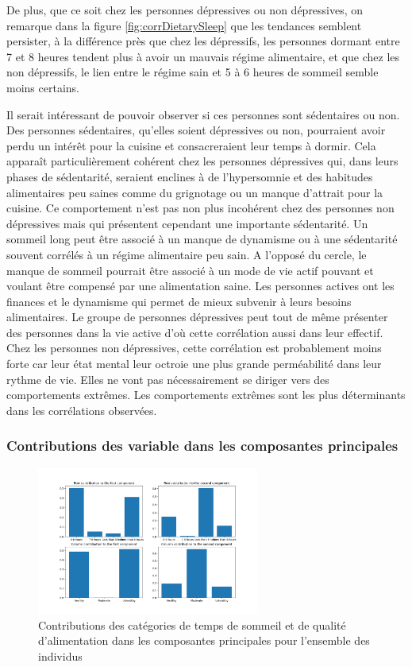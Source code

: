 De plus, que ce soit chez les personnes dépressives ou non dépressives, on remarque dans la figure \ref{fig:corrDietarySleep} que les tendances semblent persister, à la différence près que chez les dépressifs, les personnes dormant entre 7 et 8 heures tendent plus à avoir un mauvais régime alimentaire, et que chez les non dépressifs, le lien entre le régime sain et 5 à 6 heures de sommeil semble moins certains. 

Il serait intéressant de pouvoir observer si ces personnes sont sédentaires ou non. 
Des personnes sédentaires, qu’elles soient dépressives ou non, pourraient avoir perdu un intérêt pour la cuisine et consacreraient leur temps à dormir. Cela apparaît particulièrement cohérent chez les personnes dépressives qui, dans leurs phases de sédentarité, seraient enclines à de l’hypersomnie et des habitudes alimentaires peu saines comme du grignotage ou un manque d’attrait pour la cuisine. Ce comportement n’est pas non plus incohérent chez des personnes non dépressives mais qui présentent cependant une importante sédentarité. Un sommeil long peut être associé à un manque de dynamisme ou à une sédentarité souvent corrélés à un régime alimentaire peu sain.
A l’opposé du cercle, le manque de sommeil pourrait être associé à un mode de vie actif pouvant et voulant être compensé par une alimentation saine. Les personnes actives ont les finances et le dynamisme qui permet de mieux subvenir à leurs besoins alimentaires. Le groupe de personnes dépressives peut tout de même présenter des personnes dans la vie active d’où cette corrélation aussi dans leur effectif. Chez les personnes non dépressives, cette corrélation est probablement moins forte car leur état mental leur octroie une plus grande perméabilité dans leur rythme de vie. Elles ne vont pas nécessairement se diriger vers des comportements extrêmes.
Les comportements extrêmes sont les plus déterminants dans les corrélations observées.

\subsubsection{Contributions des variable dans les composantes principales}

\begin{figure}[H]
  \begin{center}
    \includegraphics[width=0.65\textwidth]{Images/Sleep_Dietary_all/RowColumnsContributions.png}
  \end{center}
  \caption{Contributions des catégories de temps de sommeil et de qualité d'alimentation dans les composantes principales pour l'ensemble des individus}
  \label{fig:contribSleepDietaryAll}
\end{figure}

